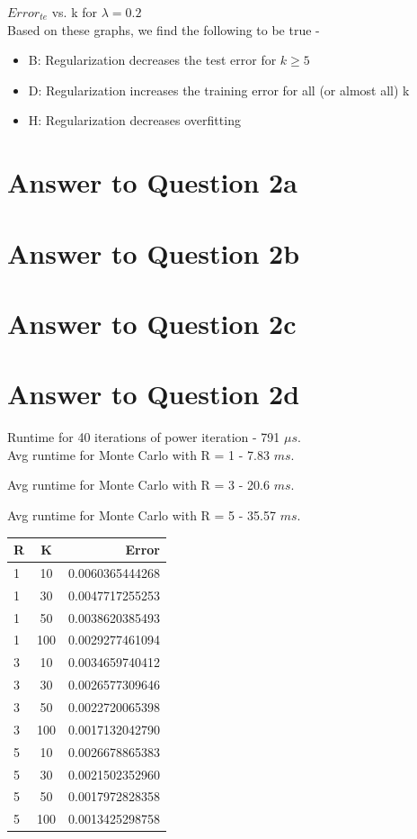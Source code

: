 \documentclass[11pt]{article}
\begin{document}
{$Error_{te}$ vs. k for $ \lambda = 0.2$\\

Based on these graphs, we find the following to be true - 
\begin{itemize}
\item B: Regularization decreases the test error for $k \geq 5$
\item D: Regularization increases the training error for all (or almost all) k
\item H: Regularization decreases overfitting
\end{itemize}


\pagebreak[4]
\section*{Answer to Question 2a}



\pagebreak[4]
\section*{Answer to Question 2b}

\pagebreak[4]
\section*{Answer to Question 2c}

\pagebreak[4]
\section*{Answer to Question 2d}
Runtime for 40 iterations of power iteration - 791 $\mu s$.\\

Avg runtime for Monte Carlo with R = 1 - 7.83 $ms$.\

Avg runtime for Monte Carlo with R = 3 - 20.6 $ms$.\

Avg runtime for Monte Carlo with R = 5 - 35.57 $ms$.\\

\begin{tabular}{l | c | r}
\hline R & K & Error \\
\hline 1 & 10 & 0.0060365444268\\
\hline 1 & 30 & 0.0047717255253\\
\hline 1 & 50 & 0.0038620385493\\
\hline 1 & 100 & 0.0029277461094\\
\hline 3 & 10 & 0.0034659740412\\
\hline 3 & 30 & 0.0026577309646\\
\hline 3 & 50 & 0.0022720065398\\
\hline 3 & 100 & 0.0017132042790\\
\hline 5 & 10 & 0.0026678865383\\
\hline 5 & 30 & 0.0021502352960\\
\hline 5 & 50 & 0.0017972828358\\
\hline 5 & 100 & 0.0013425298758\\
\hline
\end{tabular}
\vspace{10mm}

}
\end{document}
